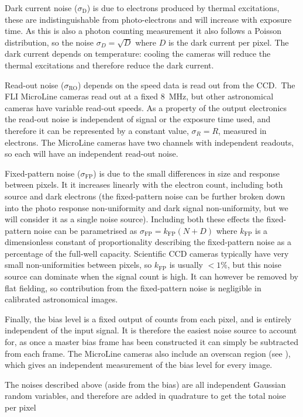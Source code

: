 \begin{colsection}
\begin{colsection}
Dark current noise ($\sigma_\text{D}$) is due to electrons produced by thermal excitations, these are indistinguishable from photo-electrons and will increase with exposure time. As this is also a photon counting measurement it also follows a Poisson distribution, so the noise $\sigma_D = \sqrt{D}$ where $D$ is the dark current per pixel. The dark current depends on temperature: cooling the cameras will reduce the thermal excitations and therefore reduce the dark current.

Read-out noise ($\sigma_\text{RO}$) depends on the speed data is read out from the CCD.\ The FLI MicroLine cameras read out at a fixed \SI{8}{\mega\hertz}, but other astronomical cameras have variable read-out speeds. As a property of the output electronics the read-out noise is independent of signal or the exposure time used, and therefore it can be represented by a constant value, $\sigma_R = R$, measured in electrons. The MicroLine cameras have two channels with independent readouts, so each will have an independent read-out noise.

Fixed-pattern noise ($\sigma_\text{FP}$) is due to the small differences in size and response between pixels. It it increases linearly with the electron count, including both source and dark electrons (the fixed-pattern noise can be further broken down into the photo response non-uniformity and dark signal non-uniformity, but we will consider it as a single noise source). Including both these effects the fixed-pattern noise can be parametrised as $\sigma_\text{FP} = k_\text{FP}(N+D)$ where $k_\text{FP}$ is a dimensionless constant of proportionality describing the fixed-pattern noise as a percentage of the full-well capacity. Scientific CCD cameras typically have very small non-uniformities between pixels, so $k_\text{FP}$ is usually $<1\%$, but this noise source can dominate when the signal count is high. It can however be removed by flat fielding, so contribution from the fixed-pattern noise is negligible in calibrated astronomical images.

Finally, the bias level is a fixed output of counts from each pixel, and is entirely independent of the input signal. It is therefore the easiest noise source to account for, as once a master bias frame has been constructed it can simply be subtracted from each frame. The MicroLine cameras also include an overscan region (see ), which gives an independent measurement of the bias level for every image.

The noises described above (aside from the bias) are all independent Gaussian random variables, and therefore are added in quadrature to get the total noise per pixel


\end{colsection}
\end{colsection}
